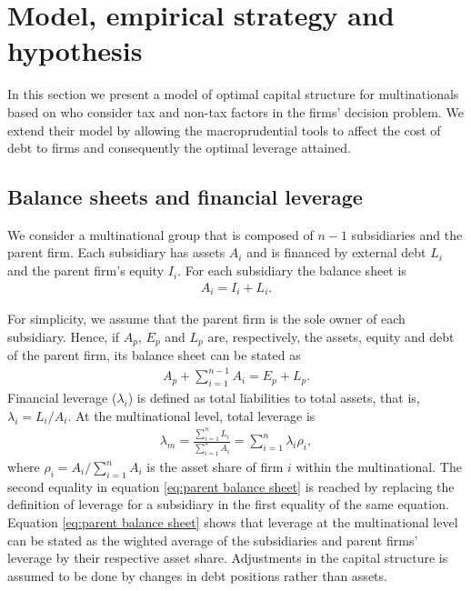 \documentclass[12pt]{article}
\begin{document}
		\section{Model, empirical strategy and hypothesis} \label{sec:strategy}
	In this section we present a model of optimal capital structure for multinationals based on \cite{huizinga2008capital} who consider tax and non-tax factors in the firms' decision problem. We extend their model by allowing the macroprudential tools to affect the cost of debt to firms and consequently the optimal leverage attained.  
	\subsection{Balance sheets and financial leverage}
	\label{subsec:balancesheet}
	We consider a multinational group that is composed of $n-1$ subsidiaries and the parent firm. Each subsidiary has assets $A_i$ and is financed by external debt $L_i$ and the parent firm's equity $I_i$. For each subsidiary the balance sheet is
	\begin{equation}
	\begin{aligned}
	A_i=I_i+L_i. 
	\end{aligned}
	\label{eq:sub balance sheet}
	\end{equation}
	
	For simplicity, we assume that the parent firm is the sole owner of each subsidiary. Hence, if $A_p$, $E_p$ and $L_p$ are, respectively, the assets, equity and debt of the parent firm, its balance sheet can be stated as  
	\begin{equation}
	\begin{aligned}
	A_p+\sum_{i=1}^{n-1}A_i=E_p+L_p. 
	\end{aligned}
	\label{eq:parent balance sheet}
	\end{equation}
	Financial leverage ($\lambda_i$) is defined as total liabilities to total assets, that is, $\lambda_i=L_i/A_i$. At the multinational level, total leverage is
	\begin{equation}
	\begin{aligned}
	\lambda_m=\frac{\sum_{i=1}^{n}L_i}{\sum_{i=1}^{n}A_i}=\sum_{i=1}^{n}\lambda_i\rho_i, 
	\end{aligned}
	\label{eq:total leverage}
	\end{equation} 
	where $\rho_i=A_i/\sum_{i=1}^{n}A_i$ is the asset share of firm $i$ within the multinational. The second equality in equation \ref{eq:parent balance sheet} is reached by replacing the definition of leverage for a subsidiary in the first equality of the same equation. Equation \ref{eq:parent balance sheet} shows that leverage at the multinational level can be stated as the wighted average of the subsidiaries and parent firms' leverage by their respective asset share. Adjustments in the capital structure is assumed to be done by changes in debt positions rather than assets. 
\end{document}
